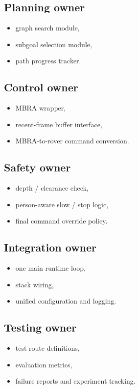 \documentclass[11pt,a4paper]{article}
\begin{document}
\subsection*{Planning owner}
\begin{itemize}[nosep]
  \item graph search module,
  \item subgoal selection module,
  \item path progress tracker.
\end{itemize}

\subsection*{Control owner}
\begin{itemize}[nosep]
  \item MBRA wrapper,
  \item recent-frame buffer interface,
  \item MBRA-to-rover command conversion.
\end{itemize}

\subsection*{Safety owner}
\begin{itemize}[nosep]
  \item depth / clearance check,
  \item person-aware slow / stop logic,
  \item final command override policy.
\end{itemize}

\subsection*{Integration owner}
\begin{itemize}[nosep]
  \item one main runtime loop,
  \item stack wiring,
  \item unified configuration and logging.
\end{itemize}

\subsection*{Testing owner}
\begin{itemize}[nosep]
  \item test route definitions,
  \item evaluation metrics,
  \item failure reports and experiment tracking.
\end{itemize}
\end{document}
